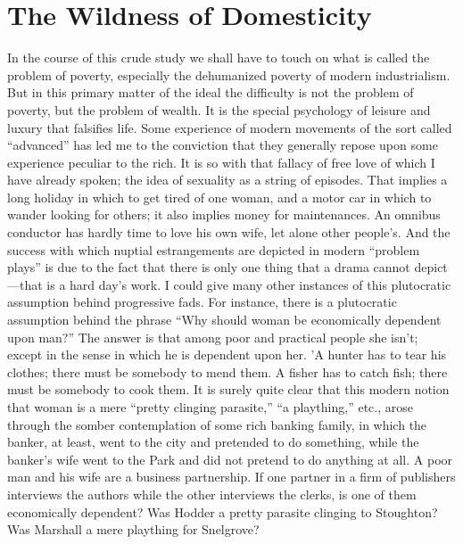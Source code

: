 \documentclass{book}
\begin{document}
\chapter{The Wildness of Domesticity}
\label{chapter-9}
In the course of this crude study we shall have to touch on what is called the problem of poverty, especially the dehumanized poverty of modern industrialism. But in this primary matter of the ideal the difficulty is not the problem of poverty, but the problem of wealth. It is the special psychology of leisure and luxury that falsifies life. Some experience of modern movements of the sort called “advanced” has led me to the conviction that they generally repose upon some experience peculiar to the rich. It is so with that fallacy of free love of which I have already spoken; the idea of sexuality as a string of episodes. That implies a long holiday in which to get tired of one woman, and a motor car in which to wander looking for others; it also implies money for maintenances. An omnibus conductor has hardly time to love his own wife, let alone other people’s. And the success with which nuptial estrangements are depicted in modern “problem plays” is due to the fact that there is only one thing that a drama cannot depict—that is a hard day’s work. I could give many other instances of this plutocratic assumption behind progressive fads. For instance, there is a plutocratic assumption behind the phrase “Why should woman be economically dependent upon man?” The answer is that among poor and practical people she isn’t; except in the sense in which he is dependent upon her. ’A hunter has to tear his clothes; there must be somebody to mend them. A fisher has to catch fish; there must be somebody to cook them. It is surely quite clear that this modern notion that woman is a mere “pretty clinging parasite,” “a plaything,” etc., arose through the somber contemplation of some rich banking family, in which the banker, at least, went to the city and pretended to do something, while the banker’s wife went to the Park and did not pretend to do anything at all. A poor man and his wife are a business partnership. If one partner in a firm of publishers interviews the authors while the other interviews the clerks, is one of them economically dependent? Was Hodder a pretty parasite clinging to Stoughton? Was Marshall a mere plaything for Snelgrove?
\end{document}

